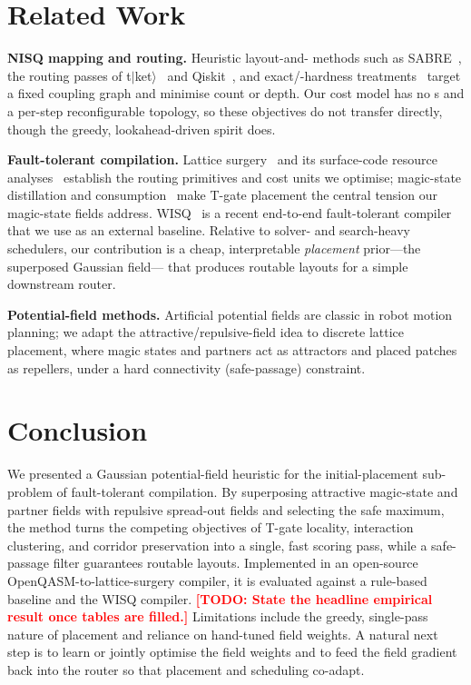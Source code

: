 \documentclass[10pt,conference]{IEEEtran}
\theoremstyle{definition}
\theoremstyle{remark}
\newcommand{\SWAP}{\mathrm{SWAP}}
\newcommand{\NP}{\mathsf{NP}}
\newcommand{\todo}[1]{\textcolor{red}{\textbf{[TODO: #1]}}}
\begin{document}
\section{Related Work}
\label{sec:related}

\textbf{NISQ mapping and routing.} Heuristic layout-and-\SWAP{} methods such as
SABRE~\cite{li2019sabre}, the routing passes of
\mbox{t$|$ket$\rangle$}~\cite{sivarajah2020tket} and Qiskit~\cite{qiskit}, and
exact/\NP-hardness treatments~\cite{siraichi2018qubit} target a fixed coupling
graph and minimise \SWAP{} count or depth. Our cost model has no \SWAP{}s and a
per-step reconfigurable topology, so these objectives do not transfer directly,
though the greedy, lookahead-driven spirit does.

\textbf{Fault-tolerant compilation.} Lattice surgery~\cite{horsman2012lattice}
and its surface-code resource analyses~\cite{litinski2019game,
beverland2022surface} establish the routing primitives and cost units we
optimise; magic-state distillation and consumption~\cite{bravyi2005magic} make
T-gate placement the central tension our magic-state fields address. WISQ~\cite{wisq}
is a recent end-to-end fault-tolerant compiler that we use as an external
baseline. Relative to solver- and search-heavy schedulers, our contribution is
a cheap, interpretable \emph{placement} prior---the superposed Gaussian field---
that produces routable layouts for a simple downstream router.

\textbf{Potential-field methods.} Artificial potential fields are classic in
robot motion planning; we adapt the attractive/repulsive-field idea to discrete
lattice placement, where magic states and partners act as attractors and placed
patches as repellers, under a hard connectivity (safe-passage) constraint.

\section{Conclusion}
\label{sec:conclusion}

We presented a Gaussian potential-field heuristic for the initial-placement
sub-problem of fault-tolerant compilation. By superposing attractive
magic-state and partner fields with repulsive spread-out fields and selecting
the safe maximum, the method turns the competing objectives of T-gate locality,
interaction clustering, and corridor preservation into a single, fast scoring
pass, while a safe-passage filter guarantees routable layouts. Implemented in an
open-source OpenQASM-to-lattice-surgery compiler, it is evaluated against a
rule-based baseline and the WISQ compiler.
\todo{State the headline empirical result once tables are filled.}
Limitations include the greedy, single-pass nature of placement and reliance on
hand-tuned field weights. A natural next step is to learn or jointly optimise
the field weights and to feed the field gradient back into the router so that
placement and scheduling co-adapt.



\end{document}
